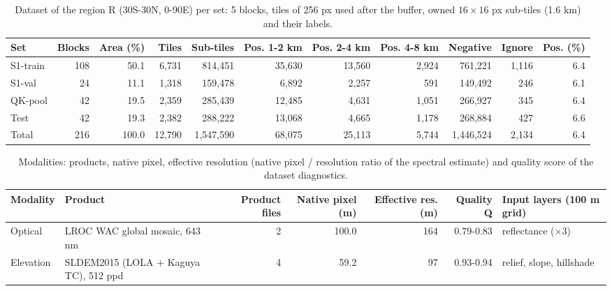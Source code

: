 
\begin{table}[t]
\centering
\caption{Dataset of the region R (30\textdegree S-30\textdegree N, 0-90\textdegree E) per set: 5\textdegree{} blocks, tiles of 256 px used after the buffer, owned $16\times16$ px sub-tiles (1.6 km) and their labels.}
\label{tab:dataset_sets}
\footnotesize
\begin{tabular}{lrrrrrrrrrr}
\toprule
Set & Blocks & Area (\%) & Tiles & Sub-tiles & Pos. 1-2 km & Pos. 2-4 km & Pos. 4-8 km & Negative & Ignore & Pos. (\%) \\
\midrule
S1-train & 108 & 50.1 & 6{,}731 & 814{,}451 & 35{,}630 & 13{,}560 & 2{,}924 & 761{,}221 & 1{,}116 & 6.4 \\
S1-val & 24 & 11.1 & 1{,}318 & 159{,}478 & 6{,}892 & 2{,}257 & 591 & 149{,}492 & 246 & 6.1 \\
QK-pool & 42 & 19.5 & 2{,}359 & 285{,}439 & 12{,}485 & 4{,}631 & 1{,}051 & 266{,}927 & 345 & 6.4 \\
Test & 42 & 19.3 & 2{,}382 & 288{,}222 & 13{,}068 & 4{,}665 & 1{,}178 & 268{,}884 & 427 & 6.6 \\
\midrule
Total & 216 & 100.0 & 12{,}790 & 1{,}547{,}590 & 68{,}075 & 25{,}113 & 5{,}744 & 1{,}446{,}524 & 2{,}134 & 6.4 \\
\bottomrule
\end{tabular}
\end{table}

\begin{table}[t]
\centering
\caption{Modalities: products, native pixel, effective resolution (native pixel / resolution ratio of the spectral estimate) and quality score of the dataset diagnostics.}
\label{tab:dataset_modalities}
\footnotesize
\begin{tabular}{llrrrrl}
\toprule
Modality & Product & Product files & Native pixel (m) & Effective res. (m) & Quality Q & Input layers (100 m grid) \\
\midrule
Optical & LROC WAC global mosaic, 643 nm & 2 & 100.0 & 164 & 0.79-0.83 & reflectance ($\times$3) \\
Elevation & SLDEM2015 (LOLA + Kaguya TC), 512 ppd & 4 & 59.2 & 97 & 0.93-0.94 & relief, slope, hillshade \\
\bottomrule
\end{tabular}
\end{table}
